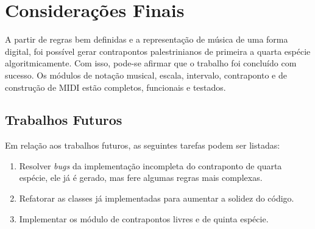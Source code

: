 \chapter[Considerações Finais]{Considerações Finais} \label{c4}
  A partir de regras bem definidas e a representação de música de uma forma digital, foi possível gerar contrapontos palestrinianos de primeira a quarta espécie algoritmicamente. Com isso, pode-se afirmar que o trabalho foi concluído com sucesso. Os módulos de notação musical, escala, intervalo, contraponto e de construção de MIDI estão completos, funcionais e testados.

  \section[Trabalhos Futuros]{Trabalhos Futuros}

    Em relação aos trabalhos futuros, as seguintes tarefas podem ser listadas:

    \begin{enumerate}
      \item Resolver \textit{bugs} da implementação incompleta do contraponto de quarta espécie, ele já é gerado, mas fere algumas regras mais complexas.
      \item Refatorar as classes já implementadas para aumentar a solidez do código.
      \item Implementar os módulo de contrapontos livres e de quinta espécie.
    \end{enumerate}
